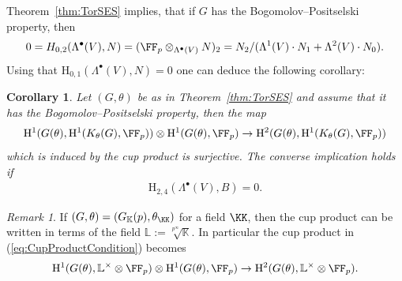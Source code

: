 \documentclass{amsart}
\newtheorem{cor}[thm]{Corollary}
\theoremstyle{definition}
\theoremstyle{remark}
\newtheorem{rem}[thm]{Remark}
\newcommand{\rmH}{\mathrm{H}}
\numberwithin{equation}{section}
\begin{document}
Theorem~\ref{thm:TorSES} implies, that if $G$ has the Bogomolov--Positselski property, then 
\begin{align*}
    0=H_{0,2}(\Lambda^\bullet(V),N)=(\FF_p\otimes_{\Lambda^\bullet(V)}N)_2=N_2/(\Lambda^1(V)\cdot  N_1+\Lambda^2(V)\cdot N_0).
\end{align*}
Using that $\rmH_{0,1}(\Lambda^\bullet(V),N)=0$ one can deduce the following corollary:
\begin{cor}
\label{cor:CupProductSurjective}
    Let $(G,\theta)$ be as in Theorem~\ref{thm:TorSES} and assume that it has the Bogomolov--Positselski property, then the map
    \begin{align}
        \label{eq:CupProductCondition}
        \rmH^1(G(\theta),\rmH^1(K_\theta(G),\FF_p))\otimes \rmH^1(G(\theta),\FF_p)\to \rmH^2(G(\theta),\rmH^1(K_\theta(G),\FF_p))
    \end{align}
    which is induced by the cup product is surjective. The converse implication holds if
    \begin{align*}
        \rmH_{2,4}(\Lambda^\bullet(V),B)=0 .
    \end{align*}
\end{cor}
\begin{rem}
    If $(G,\theta)=(G_\mathbb{K}(p),\theta_{\KK})$ for a field $\KK$, then the cup product can be written in terms of the field $\mathbb{L}:=\sqrt[p^\infty]{\mathbb{K}}$. In particular the cup product in (\ref{eq:CupProductCondition}) becomes
    \begin{align*}
        \rmH^1(G(\theta),\mathbb{L}^\times\otimes \FF_p)\otimes \rmH^1(G(\theta),\FF_p)\to \rmH^2(G(\theta),\mathbb{L}^\times \otimes \FF_p).
    \end{align*}
\end{rem}
\end{document}
